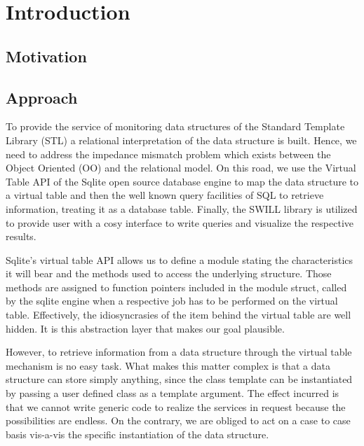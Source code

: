 \documentclass[pdftex, 11pt, a4paper]{report}
\begin{document}
\newpage


\tableofcontents

\newpage


\chapter{Introduction}
\par


\section{Motivation}
\par


\section{Approach}
\par
To provide the service of monitoring data structures of the Standard Template Library (STL) a relational interpretation of the data structure is built. Hence, we need to address the impedance mismatch problem which exists between the Object Oriented (OO) and the relational model. On this road, we use the Virtual Table API of the Sqlite open source database engine to map the data structure to a virtual table and then the well known query facilities of SQL to retrieve information, treating it as a database table. Finally, the SWILL library is utilized to provide user with a cosy interface to write queries and visualize the respective results.
\par
Sqlite's virtual table API allows us to define a module stating the characteristics it will bear and the methods used to access the underlying structure. Those methods are assigned to function pointers included in the module struct, called by the sqlite engine when a respective job has to be performed on the virtual table. Effectively, the idiosyncrasies of the item behind the virtual table are well hidden. It is this abstraction layer that makes our goal plausible.
\par
However, to retrieve information from a data structure through the virtual table mechanism is no easy task. What makes this matter complex is that a data structure can store simply anything, since the class template can be instantiated by passing a user defined class as a template argument. The effect incurred is that we cannot write generic code to realize the services in request because the possibilities are endless. On the contrary, we are obliged to act on a case to case basis vis-a-vis the specific instantiation of the data structure.
\end{document}
